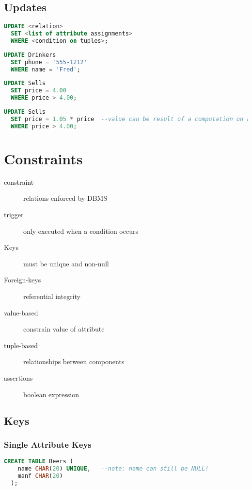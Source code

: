 \documentclass[12pt]{article}
\begin{document}
\subsection{Updates}
\begin{lstlisting}[language=sql,caption=UPDATE template]
  UPDATE <relation>
  SET <list of attribute assignments>
  WHERE <condition on tuples>;
\end{lstlisting}

\begin{lstlisting}[language=sql,caption=Change Fred's Phone number]
  UPDATE Drinkers
  SET phone = '555-1212'
  WHERE name = 'Fred';
\end{lstlisting}

\begin{lstlisting}[language=sql,caption=set maximum price on beers]
  UPDATE Sells
  SET price = 4.00
  WHERE price > 4.00;
\end{lstlisting}

\begin{lstlisting}[language=sql,caption=add tax to price]
  UPDATE Sells
  SET price = 1.05 * price  --value can be result of a computation on attributes
  WHERE price > 4.00;
\end{lstlisting}

\section{Constraints}
\begin{description}
    \item[constraint] relations enforced by DBMS
    \item[trigger] only executed when a condition occurs
\end{description}
\begin{description}
    \item[Keys] must be unique and non-null
    \item[Foreign-keys] referential integrity
    \item[value-based] constrain value of attribute
    \item[tuple-based] relationships between components
    \item[assertions] boolean expression
\end{description}
\subsection{Keys}
\subsubsection{Single Attribute Keys}
\begin{lstlisting}[language=sql,caption=ensure names are unique]
  CREATE TABLE Beers (
    name CHAR(20) UNIQUE,   --note: name can still be NULL!
    manf CHAR(20)
  );
\end{lstlisting}
\end{document}
